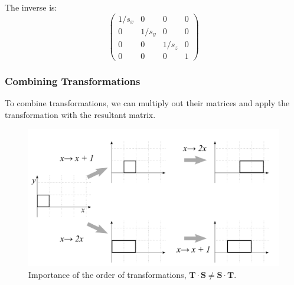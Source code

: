 \documentclass[11pt]{article}
\begin{document}
The inverse is:
\[
  \begin{pmatrix}
    1/s_x & 0 & 0 & 0 \\
    0 & 1/s_y & 0 & 0 \\
    0 & 0 & 1/s_z & 0 \\
    0 & 0 & 0 & 1
  \end{pmatrix}
\]

\subsubsection{Combining Transformations}
To combine transformations, we can multiply out their matrices and apply the transformation with the resultant matrix.

\begin{figure}[htb!]
  \caption{Importance of the order of transformations, $\bm{T} \cdot \bm{S} \neq \bm{S} \cdot \bm{T}$.}
  \includegraphics[scale=0.2]{combining}
  \centering
\end{figure}
\end{document}
